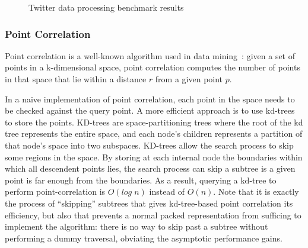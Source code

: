 \begin{figure}
  \centering
  
  \caption{Twitter data processing benchmark results}
  \label{fig:twitter_slowdown_plot}
\end{figure}

\subsubsection{Point Correlation}

Point correlation  is a well-known algorithm used in data mining~\cite{gray2000n}:
given a set of points in a k-dimensional space, point correlation computes the number of points in that space  that lie within a
distance $r$ from a given point $p$.




In a naive implementation of point correlation, each point in the space needs
to be checked against the query point.
A more efficient approach is to use kd-trees~\cite{bentley75} to store the
points. KD-trees are space-partitioning trees where the root of the kd tree represents the entire space, and each node's children represents a partition of that node's space into two subspaces.
KD-trees allow the search
process to skip some regions in the space. By storing at each internal node
the boundaries within which all descendent points lies, the search process can
skip a subtree is a given point is far enough from the boundaries. As a
result, querying a kd-tree to perform point-correlation is $O(log\; n)$ instead
of $O(n)$. Note that it is exactly the process of ``skipping'' subtrees that
gives kd-tree-based point correlation its efficiency, but also that prevents a
normal packed representation from sufficing to implement the algorithm: there
is no way to skip past a subtree without performing a dummy traversal,
obviating the asymptotic performance gains.

